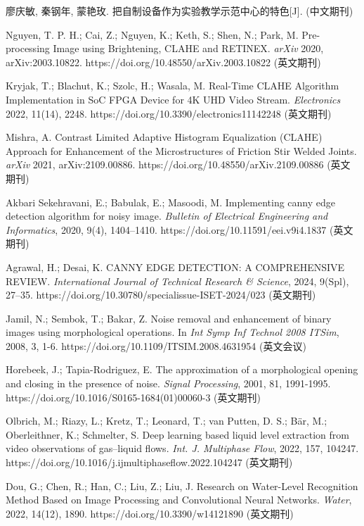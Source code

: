 \documentclass[UTF8,a4paper,fontset=none]{ctexart}
\begin{document}
{\begin{thebibliography}{99}
     廖庆敏, 秦钢年, 蒙艳玫. 把自制设备作为实验教学示范中心的特色[J].	(中文期刊)

     Nguyen, T. P. H.; Cai, Z.; Nguyen, K.; Keth, S.; Shen, N.; Park, M. Pre-processing Image using Brightening, CLAHE and RETINEX. \textit{arXiv} 2020, arXiv:2003.10822. https://doi.org/10.48550/arXiv.2003.10822	(英文期刊)

     Kryjak, T.; Blachut, K.; Szolc, H.; Wasala, M. Real-Time CLAHE Algorithm Implementation in SoC FPGA Device for 4K UHD Video Stream. \textit{Electronics} 2022, 11(14), 2248. https://doi.org/10.3390/electronics11142248	(英文期刊)

     Mishra, A. Contrast Limited Adaptive Histogram Equalization (CLAHE) Approach for Enhancement of the Microstructures of Friction Stir Welded Joints. \textit{arXiv} 2021, arXiv:2109.00886. https://doi.org/10.48550/arXiv.2109.00886	(英文期刊)

     Akbari Sekehravani, E.; Babulak, E.; Masoodi, M. Implementing canny edge detection algorithm for noisy image. \textit{Bulletin of Electrical Engineering and Informatics}, 2020, 9(4), 1404–1410. https://doi.org/10.11591/eei.v9i4.1837	(英文期刊)

     Agrawal, H.; Desai, K. CANNY EDGE DETECTION: A COMPREHENSIVE REVIEW. \textit{International Journal of Technical Research \& Science}, 2024, 9(Spl), 27–35. https://doi.org/10.30780/specialissue-ISET-2024/023	(英文期刊)

     Jamil, N.; Sembok, T.; Bakar, Z. Noise removal and enhancement of binary images using morphological operations. In \textit{Int Symp Inf Technol 2008 ITSim}, 2008, 3, 1-6. https://doi.org/10.1109/ITSIM.2008.4631954	(英文会议)

     Horebeek, J.; Tapia-Rodriguez, E. The approximation of a morphological opening and closing in the presence of noise. \textit{Signal Processing}, 2001, 81, 1991-1995. https://doi.org/10.1016/S0165-1684(01)00060-3	(英文期刊)

     Olbrich, M.; Riazy, L.; Kretz, T.; Leonard, T.; van Putten, D. S.; Bär, M.; Oberleithner, K.; Schmelter, S. Deep learning based liquid level extraction from video observations of gas–liquid flows. \textit{Int. J. Multiphase Flow}, 2022, 157, 104247. https://doi.org/10.1016/j.ijmultiphaseflow.2022.104247	(英文期刊)

     Dou, G.; Chen, R.; Han, C.; Liu, Z.; Liu, J. Research on Water-Level Recognition Method Based on Image Processing and Convolutional Neural Networks. \textit{Water}, 2022, 14(12), 1890. https://doi.org/10.3390/w14121890	(英文期刊)


\end{thebibliography}}
\end{document}
